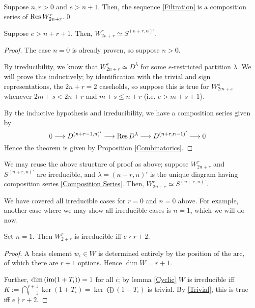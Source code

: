 \documentclass{amsart}
\begin{document}
\begin{corollary}
  Suppose $n,r > 0$ and $e > n + 1$.
  Then, the sequence \eqref{Filtration} is a composition series of $\text{Res} \, W_{2n + r}^r$.\qed
\end{corollary}

\begin{theorem}
  Suppose $e > n + r + 1$.
  Then, $W_{2n + r}^r \simeq S^{(n+r,n)'}$.
\end{theorem}
\begin{proof}
  The case $n = 0$ is already proven, so suppose $n > 0$.

  By irreducibility, we know that $W_{2n + r}^r \simeq D^\lambda$ for some $e$-restricted partition $\lambda$.
  We will prove this inductively; by identification with the trivial and sign representations, the $2n + r = 2$ caseholds, so suppose this is true for $W_{2m + s}^s$ whenever $2m + s < 2n + r$ and $m + s \leq n + r$ (i.e. $e > m + s + 1$).

  By the inductive hypothesis and irreducibility, we have a composition series given by 
  \begin{equation}
    \label{Composition Series} 0 \longrightarrow D^{(n + r - 1,n)'} \longrightarrow \text{Res} \, D^\lambda \longrightarrow D^{(n+r,n-1)'} \longrightarrow 0
   \end{equation}
  Hence the theorem is given by Proposition \ref{Combinatorics}.
\end{proof}

\iffalse
We may reuse the above structure of proof as above;
suppose $W_{2n + r}^r$ and $S^{(n+r,n)'}$ are irreducible, and $\lambda = (n+r,n)'$ is the unique diagram having composition series \eqref{Composition Series}.
Then, $W_{2n + r}^r \simeq S^{(n+r,n)'}$.

We have covered all irreducible cases for $r = 0$ and $n = 0$ above.
For example, another case where we may show all irreducible cases is $n = 1$, which we will do now.
\begin{lemma}\label{n=1 irreducibility}
    Set $n = 1$. 
    Then $W_{2 + r}^r$ is irreducible iff $e \nmid r + 2$.
\end{lemma}
\begin{proof}
  A basis element $w_i \in W$ is determined entirely by the position of the arc, of which there are $r + 1$ options.
  Hence $\dim W = r + 1$.

  Further, $\text{dim}\left( \text{im} (1 + T_i) \right) = 1$ for all $i$;
  by lemma \ref{Cyclic} $W$ is irreducible iff $K := \bigcap_{i = 1}^{r+1} \ker (1 + T_i) = \ker \bigoplus (1 + T_i)$ is trivial.
  By \ref{Trivial}, this is true iff $e \nmid r + 2$.
\end{proof}
\end{document}

